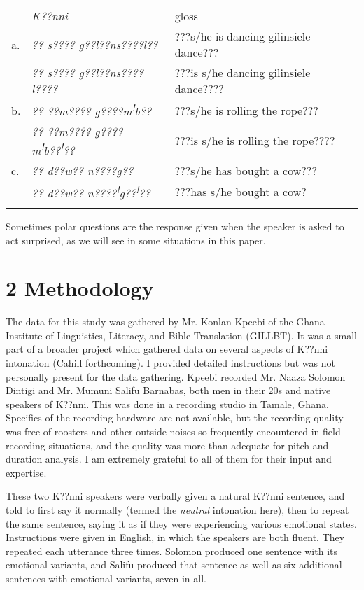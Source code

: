 \documentclass[output=paper]{langsci/langscibook}
\begin{document}
\begin{tabular}{lll} & \emph{K??nni } & gloss\\
\lsptoprule
a. & \emph{?? s???? g??l??ns????l??} & ???s/he is dancing gilinsiele dance???\\
& \emph{?? s???? g??l??ns????l????  } & ???is s/he dancing gilinsiele dance????\\
b. & \emph{?? ??m???? g????m}\textit{\textsuperscript{!}}\emph{b??} & ???s/he is rolling the rope???\\
& \emph{?? ??m???? g????m}\textit{\textsuperscript{!}}\emph{b??}\textit{\textsuperscript{!}}\emph{??} & ???is s/he is rolling the rope????\\
c. & \emph{?? d??w?? n????g??  } & ???s/he has bought a cow???\\
& \emph{?? d??w?? n????}\textit{\textsuperscript{!}}\emph{g??}\textit{\textsuperscript{!}}\emph{??  } & ???has s/he bought a cow?\\
\lspbottomrule
\end{tabular}
Sometimes polar questions are the response given when the speaker is asked to act surprised, as we will see in some situations in this paper. 

\chapter{2 Methodology}
\begin{styleBodyTextIndent}
The data for this study was gathered by Mr. Konlan Kpeebi of the Ghana Institute of Linguistics, Literacy, and Bible Translation (GILLBT). It was a small part of a broader project which gathered data on several aspects of K??nni intonation (Cahill forthcoming). I provided detailed instructions but was not personally present for the data gathering. Kpeebi recorded Mr. Naaza Solomon Dintigi and Mr. Mumuni Salifu Barnabas, both men in their 20s and native speakers of K??nni. This was done in a recording studio in Tamale, Ghana. Specifics of the recording hardware are not available, but the recording quality was free of roosters and other outside noises so frequently encountered in field recording situations, and the quality was more than adequate for pitch and duration analysis. I am extremely grateful to all of them for their input and expertise.
\end{styleBodyTextIndent}

These two K??nni speakers were verbally given a natural K??nni sentence, and told to first say it normally (termed the \emph{neutral} intonation here), then to repeat the same sentence, saying it as if they were experiencing various emotional states. Instructions were given in English, in which the speakers are both fluent. They repeated each utterance three times. Solomon produced one sentence with its emotional variants, and Salifu produced that sentence as well as six additional sentences with emotional variants, seven in all.
\end{document}
